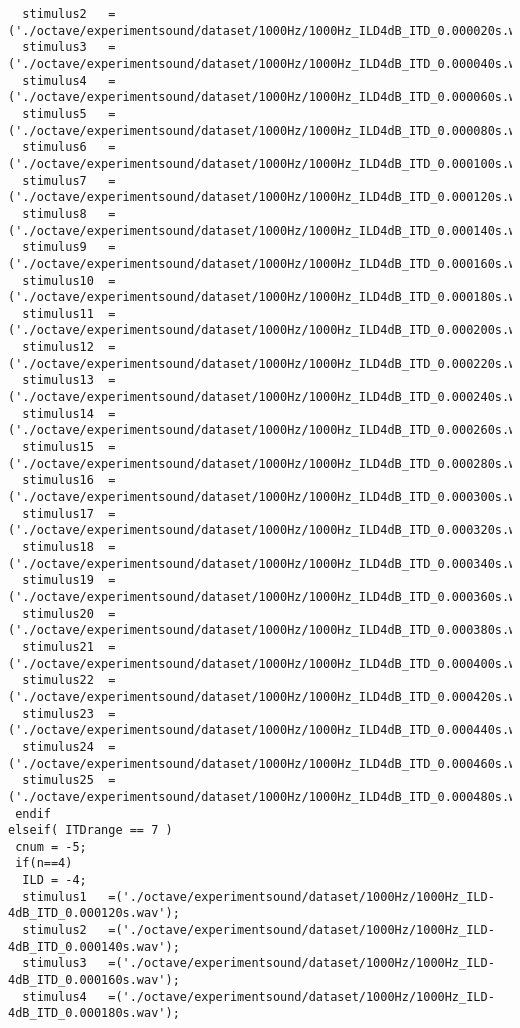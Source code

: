 {\begin{verbatim}
  stimulus2   =('./octave/experimentsound/dataset/1000Hz/1000Hz_ILD4dB_ITD_0.000020s.wav');
  stimulus3   =('./octave/experimentsound/dataset/1000Hz/1000Hz_ILD4dB_ITD_0.000040s.wav');
  stimulus4   =('./octave/experimentsound/dataset/1000Hz/1000Hz_ILD4dB_ITD_0.000060s.wav');
  stimulus5   =('./octave/experimentsound/dataset/1000Hz/1000Hz_ILD4dB_ITD_0.000080s.wav');
  stimulus6   =('./octave/experimentsound/dataset/1000Hz/1000Hz_ILD4dB_ITD_0.000100s.wav');
  stimulus7   =('./octave/experimentsound/dataset/1000Hz/1000Hz_ILD4dB_ITD_0.000120s.wav');
  stimulus8   =('./octave/experimentsound/dataset/1000Hz/1000Hz_ILD4dB_ITD_0.000140s.wav');
  stimulus9   =('./octave/experimentsound/dataset/1000Hz/1000Hz_ILD4dB_ITD_0.000160s.wav');
  stimulus10  =('./octave/experimentsound/dataset/1000Hz/1000Hz_ILD4dB_ITD_0.000180s.wav');
  stimulus11  =('./octave/experimentsound/dataset/1000Hz/1000Hz_ILD4dB_ITD_0.000200s.wav');
  stimulus12  =('./octave/experimentsound/dataset/1000Hz/1000Hz_ILD4dB_ITD_0.000220s.wav');
  stimulus13  =('./octave/experimentsound/dataset/1000Hz/1000Hz_ILD4dB_ITD_0.000240s.wav');
  stimulus14  =('./octave/experimentsound/dataset/1000Hz/1000Hz_ILD4dB_ITD_0.000260s.wav');
  stimulus15  =('./octave/experimentsound/dataset/1000Hz/1000Hz_ILD4dB_ITD_0.000280s.wav');
  stimulus16  =('./octave/experimentsound/dataset/1000Hz/1000Hz_ILD4dB_ITD_0.000300s.wav');
  stimulus17  =('./octave/experimentsound/dataset/1000Hz/1000Hz_ILD4dB_ITD_0.000320s.wav');
  stimulus18  =('./octave/experimentsound/dataset/1000Hz/1000Hz_ILD4dB_ITD_0.000340s.wav');
  stimulus19  =('./octave/experimentsound/dataset/1000Hz/1000Hz_ILD4dB_ITD_0.000360s.wav');
  stimulus20  =('./octave/experimentsound/dataset/1000Hz/1000Hz_ILD4dB_ITD_0.000380s.wav');
  stimulus21  =('./octave/experimentsound/dataset/1000Hz/1000Hz_ILD4dB_ITD_0.000400s.wav');
  stimulus22  =('./octave/experimentsound/dataset/1000Hz/1000Hz_ILD4dB_ITD_0.000420s.wav');
  stimulus23  =('./octave/experimentsound/dataset/1000Hz/1000Hz_ILD4dB_ITD_0.000440s.wav');
  stimulus24  =('./octave/experimentsound/dataset/1000Hz/1000Hz_ILD4dB_ITD_0.000460s.wav');
  stimulus25  =('./octave/experimentsound/dataset/1000Hz/1000Hz_ILD4dB_ITD_0.000480s.wav');
 endif
elseif( ITDrange == 7 )
 cnum = -5;
 if(n==4)
  ILD = -4;
  stimulus1   =('./octave/experimentsound/dataset/1000Hz/1000Hz_ILD-4dB_ITD_0.000120s.wav');
  stimulus2   =('./octave/experimentsound/dataset/1000Hz/1000Hz_ILD-4dB_ITD_0.000140s.wav');
  stimulus3   =('./octave/experimentsound/dataset/1000Hz/1000Hz_ILD-4dB_ITD_0.000160s.wav');
  stimulus4   =('./octave/experimentsound/dataset/1000Hz/1000Hz_ILD-4dB_ITD_0.000180s.wav');

\end{verbatim}}

